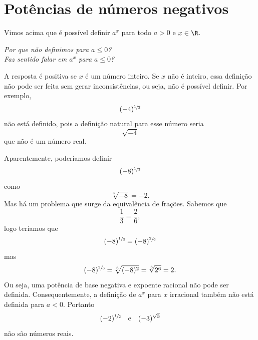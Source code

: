 \section{Potências de números negativos}

Vimos acima que é possível definir $a^x$ para todo $a>0$ e $x\in\R$.

\emph{Por que não definimos para $a\leq 0$?} \\
\emph{Faz sentido falar em $a^x$ para $a\leq0$?}

A resposta é positiva se $x$ é um número inteiro.
Se $x$ não é inteiro, essa definição não pode ser feita sem gerar
inconsistências, ou seja, não é possível definir.
Por exemplo,
\[
    (-4)^{\sfrac{1}{2}}
\]
não está definido, pois a definição natural para esse número seria
\[
  \sqrt{-4}
\]
que não é um número real.

Aparentemente, poderíamos definir
\[
  (-8)^{\sfrac{1}{3}}
\]
como
\[
  \sqrt[3]{-8} = -2.
\]
Mas há um problema que surge da equivalência de frações.
Sabemos que
\[
  \frac{1}{3} = \frac{2}{6},
\]
logo teríamos que
\[
  (-8)^{\sfrac{1}{3}}
  = (-8)^{\sfrac{2}{6}}
\]
mas
\[
  (-8)^{\sfrac{2}{6}}
  = \sqrt[6]{(-8)^2}
  = \sqrt[6]{2^6}
  = 2.
\]
Ou seja, uma potência de base negativa e expoente racional não pode ser
definida. Consequentemente, a definição de $a^x$ para $x$ irracional também não
está definida para $a<0$. Portanto
\[
  (-2)^{\sfrac{1}{2}}
  \quad\text{e}\quad
  (-3)^{\sqrt{3}}
\]
não são números reais.
